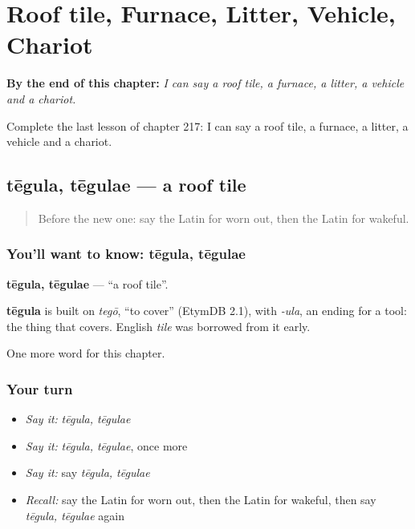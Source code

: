 
\chapter{Roof tile, Furnace, Litter, Vehicle, Chariot}
\label{ch:la-roof-tile-furnace-litter-vehicle-chariot}

\begin{chapteropening}
\textbf{By the end of this chapter:} \emph{I can say a roof tile, a furnace, a litter, a vehicle and a chariot.}

Complete the last lesson of chapter 217: I can say a roof tile, a furnace, a litter, a vehicle and a chariot.
\end{chapteropening}

\section[tēgula, tēgulae]{tēgula, tēgulae — a roof tile}

\label{lesson:LA-C217-tegula}



\begin{quote}
Before the new one: say the Latin for worn out, then the Latin for wakeful.
\end{quote}

\subsection*{You'll want to know: tēgula, tēgulae}
\textbf{tēgula, tēgulae} — \textquotedblleft{}a roof tile\textquotedblright{}.

\begin{cousinweb}
\textbf{tēgula} is built on \emph{tegō}, \textquotedblleft{}to cover\textquotedblright{} (EtymDB 2.1), with \emph{-ula}, an ending for a tool: the thing that covers. English \emph{tile} was borrowed from it early.
\end{cousinweb}

\begin{grammarlens}[title={What you've built}]
One more word for this chapter.
\end{grammarlens}

\subsection*{Your turn}
\begin{itemize}
\raggedright
  \item \emph{Say it:} \emph{tēgula, tēgulae}
  \item \emph{Say it:} \emph{tēgula, tēgulae}, once more
  \item \emph{Say it:} say \emph{tēgula, tēgulae}
  \item \emph{Recall:} say the Latin for worn out, then the Latin for wakeful, then say \emph{tēgula, tēgulae} again
\end{itemize}


